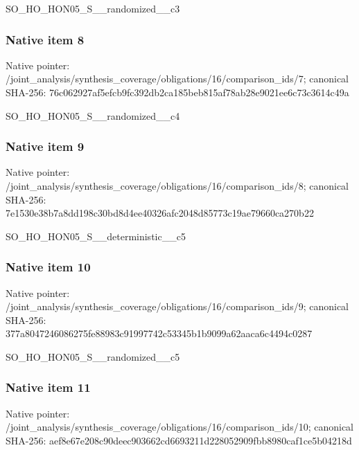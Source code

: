 \documentclass[10pt,a4paper]{article}
\begin{document}
\begingroup\raggedright\sloppy SO\_\allowbreak{}HO\_\allowbreak{}HON05\_\allowbreak{}S\_\allowbreak{}\_\allowbreak{}randomized\_\allowbreak{}\_\allowbreak{}c3\par\endgroup

\subsubsection{Native item 8}
Native pointer: /joint\_\allowbreak{}analysis/synthesis\_\allowbreak{}coverage/obligations/16/comparison\_\allowbreak{}ids/7; canonical SHA-256: 76c062927af5efcb9fc392db2ca185beb815af78ab28e9021ee6c73c3614c49a

\begingroup\raggedright\sloppy SO\_\allowbreak{}HO\_\allowbreak{}HON05\_\allowbreak{}S\_\allowbreak{}\_\allowbreak{}randomized\_\allowbreak{}\_\allowbreak{}c4\par\endgroup

\subsubsection{Native item 9}
Native pointer: /joint\_\allowbreak{}analysis/synthesis\_\allowbreak{}coverage/obligations/16/comparison\_\allowbreak{}ids/8; canonical SHA-256: 7e1530e38b7a8dd198c30bd8d4ee40326afc2048d85773c19ae79660ca270b22

\begingroup\raggedright\sloppy SO\_\allowbreak{}HO\_\allowbreak{}HON05\_\allowbreak{}S\_\allowbreak{}\_\allowbreak{}deterministic\_\allowbreak{}\_\allowbreak{}c5\par\endgroup

\subsubsection{Native item 10}
Native pointer: /joint\_\allowbreak{}analysis/synthesis\_\allowbreak{}coverage/obligations/16/comparison\_\allowbreak{}ids/9; canonical SHA-256: 377a8047246086275fe88983c91997742c53345b1b9099a62aaca6c4494c0287

\begingroup\raggedright\sloppy SO\_\allowbreak{}HO\_\allowbreak{}HON05\_\allowbreak{}S\_\allowbreak{}\_\allowbreak{}randomized\_\allowbreak{}\_\allowbreak{}c5\par\endgroup

\subsubsection{Native item 11}
Native pointer: /joint\_\allowbreak{}analysis/synthesis\_\allowbreak{}coverage/obligations/16/comparison\_\allowbreak{}ids/10; canonical SHA-256: aef8e67e208c90deec903662cd6693211d228052909fbb8980caf1ce5b04218d
\end{document}
